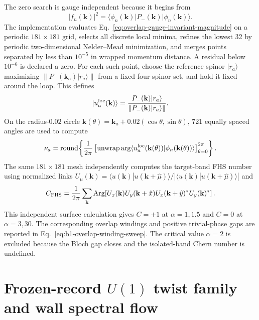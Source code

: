 \documentclass[aps,prx,twocolumn,floatfix,nofootinbib,superscriptaddress,longbibliography]{revtex4-2}
\begin{document}
The zero search is gauge independent because it begins from
\begin{equation}
 |f_n(\mathbf{k})|^2=
 \langle\phi_n(\mathbf{k})|P_-(\mathbf{k})|\phi_n(\mathbf{k})\rangle.
 \label{eq:overlap-gauge-invariant-magnitude}
\end{equation}
The implementation evaluates Eq.~\eqref{eq:overlap-gauge-invariant-magnitude} on a
periodic $181\times181$ grid, selects all discrete local minima, refines the lowest 32 by
periodic two-dimensional Nelder--Mead minimization, and merges points separated by less
than $10^{-5}$ in wrapped momentum distance.  A residual below $10^{-6}$ is declared a
zero.  For each such point, choose the reference spinor $|r_a\rangle$ maximizing
$\|P_-(\mathbf{k}_a)|r_a\rangle\|$ from a fixed four-spinor set, and hold it fixed around
the loop.  This defines
\begin{equation}
 |u_a^{\rm loc}(\mathbf{k})\rangle=
 \frac{P_-(\mathbf{k})|r_a\rangle}
 {\|P_-(\mathbf{k})|r_a\rangle\|}.
 \label{eq:overlap-local-frame}
\end{equation}
On the radius-$0.02$ circle
$\mathbf{k}(\theta)=\mathbf{k}_a+0.02(\cos\theta,\sin\theta)$, 721 equally spaced angles
are used to compute
\begin{equation}
 \nu_a=\operatorname{round}\!\left\{
 \frac{1}{2\pi}\left[
 \operatorname{unwrap}\arg
 \langle u_a^{\rm loc}(\mathbf{k}(\theta))|\phi_n(\mathbf{k}(\theta))\rangle
 \right]_{\theta=0}^{2\pi}\right\}.
 \label{eq:overlap-numerical-winding}
\end{equation}
The same $181\times181$ mesh independently computes the target-band FHS number using
normalized links
$U_\mu(\mathbf{k})=\langle u(\mathbf{k})|u(\mathbf{k}+\hat\mu)\rangle/
|\langle u(\mathbf{k})|u(\mathbf{k}+\hat\mu)\rangle|$ and
\begin{equation}
 C_{\rm FHS}=\frac{1}{2\pi}\sum_{\mathbf{k}}
 \operatorname{Arg}\!\left[
 U_x(\mathbf{k})U_y(\mathbf{k}+\hat x)
 U_x(\mathbf{k}+\hat y)^*U_y(\mathbf{k})^*\right].
 \label{eq:overlap-fhs-check}
\end{equation}
This independent surface calculation gives $C=+1$ at $\alpha=1,1.5$ and $C=0$ at
$\alpha=3,30$.  The corresponding overlap windings and positive trivial-phase gaps are
reported in Eq.~\eqref{eq:b1-overlap-winding-sweep}.  The critical value $\alpha=2$ is
excluded because the Bloch gap closes and the isolated-band Chern number is undefined.

\section{Frozen-record \texorpdfstring{$U(1)$}{U(1)} twist family and wall spectral flow}
\label{app:frozen-twist}
\end{document}
